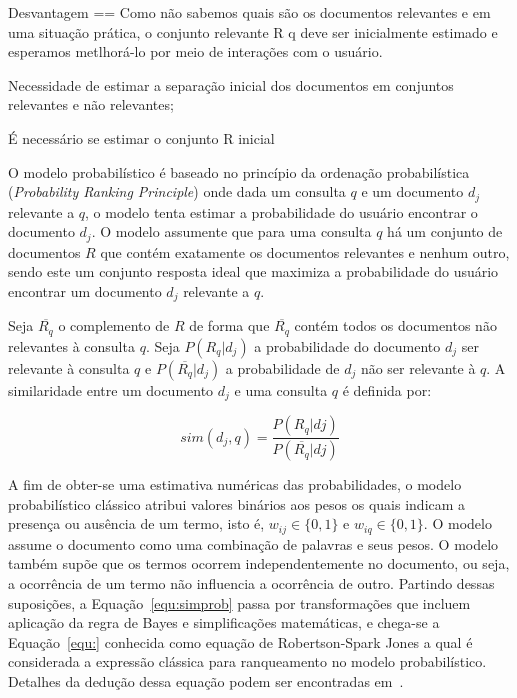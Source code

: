 Desvantagem == 
Como não sabemos quais são os documentos relevantes e em uma situação prática, o conjunto relevante R q deve ser inicialmente estimado e esperamos metlhorá-lo por meio de interações com o usuário.

Necessidade de estimar a separação inicial dos documentos em conjuntos relevantes e não relevantes;


É necessário se estimar o conjunto R inicial





O modelo probabilístico é baseado no princípio da ordenação probabilística (\textit{Probability Ranking Principle}) onde dada um consulta $q$ e um documento $d_j$ relevante a $q$, o modelo tenta estimar a probabilidade do usuário encontrar o documento $d_j$. O modelo assumente que para uma consulta $q$ há um conjunto de documentos $R$ que contém exatamente os documentos relevantes e nenhum outro, sendo este um conjunto resposta ideal que maximiza a probabilidade do usuário encontrar um documento $d_j$ relevante a $q$. 

Seja $\overline{R_q}$ o complemento de $R$ de forma que $\overline{R_q}$ contém todos os documentos não relevantes à consulta $q$. Seja $P(R_q|d_j)$ a probabilidade do documento $d_j$ ser relevante à consulta $q$ e $P(\overline{R_q}|d_j)$ a probabilidade de $d_j$ não ser relevante à $q$. A similaridade entre um documento $d_j$ e uma consulta $q$ é definida por:


\begin{equation}
	sim(d_j, q) = \frac{P(R_q|dj)}{P(\overline{R_q}|dj)}
	\label{equ:simprob}
\end{equation}




A fim de obter-se uma estimativa numéricas das probabilidades, o modelo probabilístico clássico atribui valores binários aos pesos os quais indicam a presença ou ausência de um termo, isto é, $w_{ij} \in \{0,1\}$ e $w_{iq} \in \{0,1\}$. 
O modelo assume o documento como uma combinação de palavras e seus pesos. 
O modelo também supõe que os termos ocorrem independentemente no documento, ou seja, a ocorrência de um termo não influencia a ocorrência de outro. 
Partindo dessas suposições, a Equação~\ref{equ:simprob} passa por transformações que incluem aplicação da regra de Bayes e simplificações matemáticas, e chega-se a Equação~\ref{equ:} conhecida como equação de Robertson-Spark Jones a qual é considerada a expressão clássica para ranqueamento no modelo probabilístico. Detalhes da dedução dessa equação podem ser encontradas
em~\cite{ Croft2009, Manning2008, Rijsbergen1979}.









